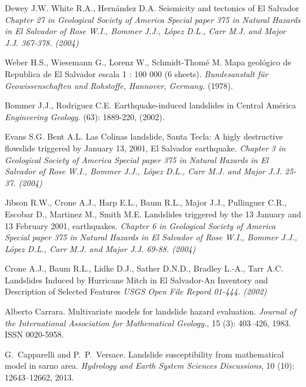 \documentclass[11pt,twoside]{rmta2010eng}%
\begin{document}
\begin{thebibliography}{99}




Dewey J.W. White R.A., Hern\'{a}ndez D.A.
\newblock Seismicity and tectonics of El Salvador
\newblock \emph{Chapter 27 in Geological Society of America Special paper 375 in Natural Hazards in El Salvador of Rose W.I., Bommer J.J., L\'{o}pez D.L., Carr M.J. and Major J.J. 367-378. (2004)}


Weber H.S., Wiesemann G., Lorenz  W., Schmidt-Thom\'{e} M.
\newblock Mapa geol\'{o}gico de Republica de El Salvador
\newblock escala 1 : 100 000 (6 sheets).
\newblock \emph{ Bundesanstalt f\"ur Geowissenschaften und Rohstoffe, Hannover, Germany.
}
 (1978).


Bommer J.J., Rodriguez C.E.
\newblock Earthquake-induced landslides in Central Am\'{e}rica
\newblock \emph{Engineering Geology}.
(63): 1889-220, (2002).


Evans S.G. Bent A.L.
\newblock Las Colinas landslide, Santa Tecla:  A higly destructive flowslide triggered by January 13, 2001, El Salvador earthquake.
\newblock \emph{Chapter 3 in Geological Society of America Special paper 375 in Natural Hazards in El Salvador of Rose W.I., Bommer J.J., L\'{o}pez D.L., Carr M.J. and Major J.J. 25-37. (2004)}



Jibson R.W., Crone A.J., Harp E.L., Baum R.L., Major J.J., Pullinguer C.R., Escobar D., Martinez M., Smith M.E. 
\newblock Landslides triggered by the 13 January and 13 February 2001, earthquakes.
\newblock \emph{ Chapter 6 in Geological Society of America Special paper 375 in Natural Hazards in El Salvador of Rose W.I., Bommer J.J., L\'{o}pez D.L., Carr M.J. and Major J.J. 69-88. (2004)}



Crone A.J., Baum R.L., Lidke D.J., Sather D.N.D., Bradley L.-A., Tarr A.C.
\newblock Landslides Induced by Hurricane Mitch in El Salvador-An Inventory and Description of Selected Features
\newblock \emph{USGS Open File Repord 01-444. (2002)}


Alberto Carrara.
\newblock Multivariate models for landslide hazard evaluation.
\newblock \emph{Journal of the International Association for Mathematical
  Geology.}, 15 (3): 403--426, 1983.
\newblock ISSN 0020-5958.


G.~Capparelli and P.~P.~Versace.
\newblock Landslide susceptibility from mathematical model in sarno area.
\newblock \emph{Hydrology and Earth System Sciences Discussions}, 10
  (10): 12643--12662, 2013.



\end{thebibliography}
\end{document}
